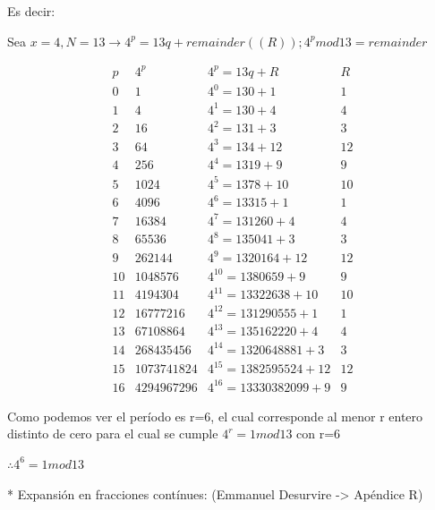 \documentclass[11pt, spanish]{report}
\begin{document}
 Es decir:

 Sea $x = 4, N = 13 \rightarrow 4^p = 13 q + remainder ((R)); 4^p mod 13 = remainder$

 \[\begin{matrix}
         p  &   4^p & 4^p = 13 q                    + R    &   R   \\
         0  &   1   & 4^0 = 13 0                    + 1    & 1     \\
         1  &   4   & 4^1 = 13 0                    + 4    & 4     \\
         2  &   16  & 4^2 = 13 1                    + 3    & 3     \\
         3  &   64  & 4^3 = 13 4                    + 12   & 12    \\
         4  &   256  & 4^4 = 13 19                  + 9    & 9     \\
         5  &   1024  & 4^5 = 13 78                 + 10   & 10    \\ %
         6  &   4096  & 4^6 = 13 315                + 1    & 1     \\
         7  &   16384  & 4^7 = 13 1260              + 4    & 4     \\
         8  &   65536  & 4^8 = 13 5041              + 3    & 3     \\
         9  &   262144  & 4^9 = 13 20164            + 12   & 12    \\
         10 &   1048576  & 4^10 = 13 80659          + 9    & 9     \\
         11 &   4194304  & 4^11 = 13 322638         + 10   & 10    \\
         12 &   16777216  & 4^12 = 13 1290555       + 1    & 1     \\
         13 &   67108864  & 4^13 = 13 5162220       + 4    & 4     \\
         14 &   268435456  & 4^14 = 13 20648881     + 3    & 3     \\
         15 &   1073741824  & 4^15 = 13 82595524    + 12   & 12    \\
         16 &   4294967296  & 4^16 = 13 330382099   + 9    & 9     
     \end{matrix}
 \]

 Como podemos ver el período es r=6, el cual corresponde al menor r entero distinto de cero para el cual se cumple $4^r=1 mod 13$ con r=6

 $\therefore 4^6 = 1 mod 13$

* Expansión en fracciones contínues: (Emmanuel Desurvire -> Apéndice R)
\end{document}
